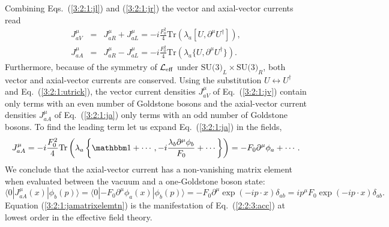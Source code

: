 \documentclass[twoside,12pt]{article}
\begin{document}
   Combining Eqs.\ (\ref{3:2:1:jl}) and (\ref{3:2:1:jr}) the vector and
axial-vector currents read
\begin{eqnarray}
\label{3:2:1:jv}
J^\mu_{aV}&=&J^\mu_{aR}+J^\mu_{aL}=-i\frac{F^2_0}{4}
\mbox{Tr}\left(\lambda_a[U,\partial^\mu U^\dagger]\right),\\
\label{3:2:1:ja}
J^\mu_{aA}&=&J^\mu_{aR}-J^\mu_{aL}=-i\frac{F^2_0}{4}
\mbox{Tr}\left(\lambda_a\{U,\partial^\mu U^\dagger\}\right).
\end{eqnarray}
   Furthermore, because of the symmetry of ${\cal L}_{\rm eff}$ under
$\mbox{SU(3)}_L\times\mbox{SU(3)}_R$, both vector and axial-vector
currents are conserved.
   Using the substitution $U\leftrightarrow U^\dagger$ and Eq.~(\ref{3:2:1:utrick}),
the vector current densities $J^\mu_{aV}$ of Eq.\ (\ref{3:2:1:jv})
contain only terms with an even number of Goldstone bosons and the axial-vector
current densities $J^\mu_{aA}$ of Eq.\ (\ref{3:2:1:ja}) only terms with an odd
number of Goldstone bosons.
   To find the leading term let us expand Eq.\ (\ref{3:2:1:ja}) in the fields,
\begin{displaymath}
J^\mu_{aA}=-i\frac{F^2_0}{4}\mbox{Tr}\left(\lambda_a\left\{{\mathbbm 1}+\cdots,
-i\frac{\lambda_b\partial^\mu \phi_b}{F_0}+\cdots\right\}\right)=
-F_0\partial^\mu\phi_a+\cdots.
\end{displaymath}
   We conclude that the axial-vector current has a non-vanishing
matrix element when evaluated between the vacuum and a one-Goldstone boson
state:
\begin{equation}
\label{3:2:1:jamatrixelemtn}
\langle 0|J^\mu_{aA}(x)|\phi_b(p)\rangle
=\langle 0|-F_0\partial^\mu\phi_a(x)|\phi_b(p)\rangle
=-F_0\partial^\mu \exp(-ip\cdot x)\delta_{ab}
=ip^\mu F_0\exp(-ip\cdot x)\delta_{ab}.
\end{equation}
   Equation (\ref{3:2:1:jamatrixelemtn}) is the manifestation of
Eq.~(\ref{2:2:3:acc}) at lowest order in the effective field theory.
\end{document}
